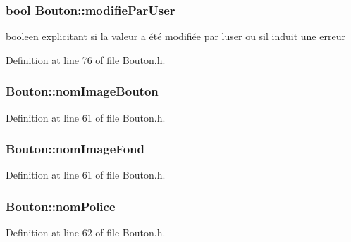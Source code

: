 \subsubsection[{modifie\+Par\+User}]{\setlength{\rightskip}{0pt plus 5cm}bool Bouton\+::modifie\+Par\+User}\label{class_bouton_a96ebc0ef1ca73c65048e3d52293f6ad3}


booleen explicitant si la valeur a été modifiée par l\textquotesingle{}user ou s\textquotesingle{}il induit une erreur 



Definition at line 76 of file Bouton.\+h.

\hypertarget{class_bouton_a7091aa4ae9bb51de3b01f37230d5c0f9}{}
\subsubsection[{nom\+Image\+Bouton}]{ Bouton\+::nom\+Image\+Bouton}\label{class_bouton_a7091aa4ae9bb51de3b01f37230d5c0f9}


Definition at line 61 of file Bouton.\+h.

\hypertarget{class_bouton_acc4ce08bca16c13c7f221b6f477b3939}{}
\subsubsection[{nom\+Image\+Fond}]{ Bouton\+::nom\+Image\+Fond}\label{class_bouton_acc4ce08bca16c13c7f221b6f477b3939}


Definition at line 61 of file Bouton.\+h.

\hypertarget{class_bouton_ac9c2102dfe76fe502d6a26270d45ba72}{}
\subsubsection[{nom\+Police}]{ Bouton\+::nom\+Police}\label{class_bouton_ac9c2102dfe76fe502d6a26270d45ba72}


Definition at line 62 of file Bouton.\+h.

\hypertarget{class_bouton_a0f5cf4db7a478cd25d6939585a38b1ec}{}
